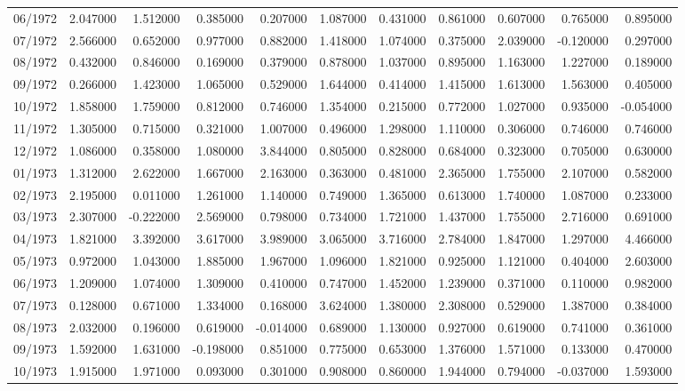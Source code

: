 \begin{tabular}{lrrrrrrrrrr}
06/1972 & 2.047000 & 1.512000 & 0.385000 & 0.207000 & 1.087000 & 0.431000 & 0.861000 & 0.607000 & 0.765000 & 0.895000 \\
07/1972 & 2.566000 & 0.652000 & 0.977000 & 0.882000 & 1.418000 & 1.074000 & 0.375000 & 2.039000 & -0.120000 & 0.297000 \\
08/1972 & 0.432000 & 0.846000 & 0.169000 & 0.379000 & 0.878000 & 1.037000 & 0.895000 & 1.163000 & 1.227000 & 0.189000 \\
09/1972 & 0.266000 & 1.423000 & 1.065000 & 0.529000 & 1.644000 & 0.414000 & 1.415000 & 1.613000 & 1.563000 & 0.405000 \\
10/1972 & 1.858000 & 1.759000 & 0.812000 & 0.746000 & 1.354000 & 0.215000 & 0.772000 & 1.027000 & 0.935000 & -0.054000 \\
11/1972 & 1.305000 & 0.715000 & 0.321000 & 1.007000 & 0.496000 & 1.298000 & 1.110000 & 0.306000 & 0.746000 & 0.746000 \\
12/1972 & 1.086000 & 0.358000 & 1.080000 & 3.844000 & 0.805000 & 0.828000 & 0.684000 & 0.323000 & 0.705000 & 0.630000 \\
01/1973 & 1.312000 & 2.622000 & 1.667000 & 2.163000 & 0.363000 & 0.481000 & 2.365000 & 1.755000 & 2.107000 & 0.582000 \\
02/1973 & 2.195000 & 0.011000 & 1.261000 & 1.140000 & 0.749000 & 1.365000 & 0.613000 & 1.740000 & 1.087000 & 0.233000 \\
03/1973 & 2.307000 & -0.222000 & 2.569000 & 0.798000 & 0.734000 & 1.721000 & 1.437000 & 1.755000 & 2.716000 & 0.691000 \\
04/1973 & 1.821000 & 3.392000 & 3.617000 & 3.989000 & 3.065000 & 3.716000 & 2.784000 & 1.847000 & 1.297000 & 4.466000 \\
05/1973 & 0.972000 & 1.043000 & 1.885000 & 1.967000 & 1.096000 & 1.821000 & 0.925000 & 1.121000 & 0.404000 & 2.603000 \\
06/1973 & 1.209000 & 1.074000 & 1.309000 & 0.410000 & 0.747000 & 1.452000 & 1.239000 & 0.371000 & 0.110000 & 0.982000 \\
07/1973 & 0.128000 & 0.671000 & 1.334000 & 0.168000 & 3.624000 & 1.380000 & 2.308000 & 0.529000 & 1.387000 & 0.384000 \\
08/1973 & 2.032000 & 0.196000 & 0.619000 & -0.014000 & 0.689000 & 1.130000 & 0.927000 & 0.619000 & 0.741000 & 0.361000 \\
09/1973 & 1.592000 & 1.631000 & -0.198000 & 0.851000 & 0.775000 & 0.653000 & 1.376000 & 1.571000 & 0.133000 & 0.470000 \\
10/1973 & 1.915000 & 1.971000 & 0.093000 & 0.301000 & 0.908000 & 0.860000 & 1.944000 & 0.794000 & -0.037000 & 1.593000 \\

\end{tabular}
